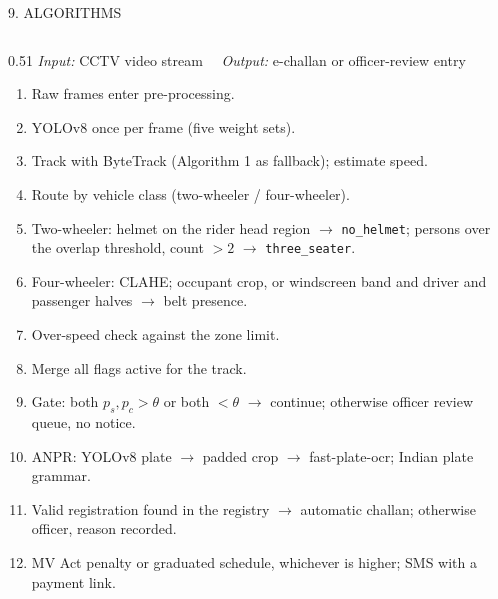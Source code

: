 \documentclass[aspectratio=169,10pt,t]{beamer}
\begin{document}
\begin{frame}{9. ALGORITHMS}
\begin{columns}[T,onlytextwidth]
\begin{column}{0.51\textwidth}
{\tiny\textit{Input:} CCTV video stream \ \ \textit{Output:} e-challan or officer-review entry}
\scriptsize
\begin{enumerate}\setlength{\itemsep}{0em}
  \item Raw frames enter pre-processing.
  \item YOLOv8 once per frame (five weight sets).
  \item Track with ByteTrack (Algorithm 1 as fallback); estimate speed.
  \item Route by vehicle class (two-wheeler / four-wheeler).
  \item Two-wheeler: helmet on the rider head region $\rightarrow$ \texttt{no\_helmet}; persons over the overlap
        threshold, count $>2$ $\rightarrow$ \texttt{three\_seater}.
  \item Four-wheeler: CLAHE; occupant crop, or windscreen band and driver and passenger halves $\rightarrow$ belt
        presence.
  \item Over-speed check against the zone limit.
  \item Merge all flags active for the track.
  \item Gate: both $p_s,p_c>\theta$ or both $<\theta$ $\rightarrow$ continue; otherwise officer review queue, no notice.
  \item ANPR: YOLOv8 plate $\rightarrow$ padded crop $\rightarrow$ fast-plate-ocr; Indian plate grammar.
  \item Valid registration found in the registry $\rightarrow$ automatic challan; otherwise officer, reason recorded.
  \item MV Act penalty or graduated schedule, whichever is higher; SMS with a payment link.
\end{enumerate}
\end{column}
\end{columns}
\end{frame}
\end{document}
